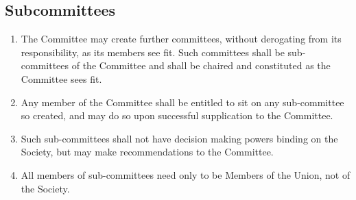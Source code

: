 \documentclass[a4paper]{tufte-handout}
\begin{document}
\subsection{Subcommittees}
\begin{enumerate}[resume]
    \item The Committee may create further committees, without derogating from its responsibility, as its members see fit. Such committees shall be sub-committees of the Committee and shall be chaired and constituted as the Committee sees fit.
    \item Any member of the Committee shall be entitled to sit on any sub-committee so created, and may do so upon successful supplication to the Committee.
    \item Such sub-committees shall not have decision making powers binding on the Society, but may make recommendations to the Committee.
    \item All members of sub-committees need only to be Members of the Union, not of the Society.
\end{enumerate}
\end{document}
